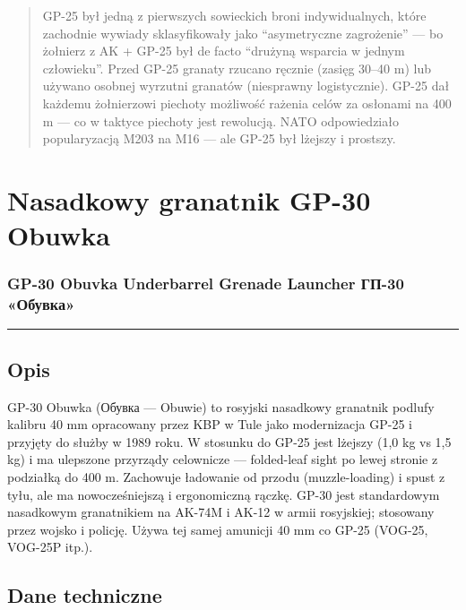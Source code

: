 \documentclass[12pt,openany,oneside]{book}
\begin{document}
\begin{quote}
GP-25 był jedną z pierwszych sowieckich broni indywidualnych, które
zachodnie wywiady sklasyfikowały jako ``asymetryczne zagrożenie'' --- bo
żołnierz z AK + GP-25 był de facto ``drużyną wsparcia w jednym
człowieku''. Przed GP-25 granaty rzucano ręcznie (zasięg 30--40 m) lub
używano osobnej wyrzutni granatów (niesprawny logistycznie). GP-25 dał
każdemu żołnierzowi piechoty możliwość rażenia celów za osłonami na 400
m --- co w taktyce piechoty jest rewolucją. NATO odpowiedziało
popularyzacją M203 na M16 --- ale GP-25 był lżejszy i prostszy.
\end{quote}

\chapter{Nasadkowy granatnik GP-30
Obuwka}\label{nasadkowy-granatnik-gp-30-obuwka}

\subsection{GP-30 Obuvka Underbarrel Grenade Launcher \textbar{} ГП-30
«Обувка»}\label{gp-30-obuvka-underbarrel-grenade-launcher-ux433ux43f-30-ux43eux431ux443ux432ux43aux430}

\begin{center}\rule{0.5\linewidth}{0.5pt}\end{center}

\section{Opis}\label{opis-80}

GP-30 Obuwka (Обувка --- Obuwie) to rosyjski nasadkowy granatnik podlufy
kalibru 40 mm opracowany przez KBP w Tule jako modernizacja GP-25 i
przyjęty do służby w 1989 roku. W stosunku do GP-25 jest lżejszy (1,0 kg
vs 1,5 kg) i ma ulepszone przyrządy celownicze --- folded-leaf sight po
lewej stronie z podziałką do 400 m. Zachowuje ładowanie od przodu
(muzzle-loading) i spust z tyłu, ale ma nowocześniejszą i ergonomiczną
rączkę. GP-30 jest standardowym nasadkowym granatnikiem na AK-74M i
AK-12 w armii rosyjskiej; stosowany przez wojsko i policję. Używa tej
samej amunicji 40 mm co GP-25 (VOG-25, VOG-25P itp.).

\section{Dane techniczne}\label{dane-techniczne-80}
\end{document}
